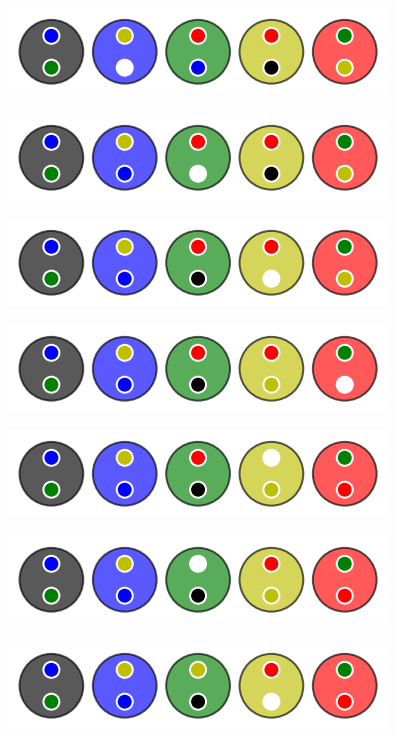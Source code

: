 \begin{multicols}{2}
	\begin{center}   %
		\includegraphics[scale= 0.45]{content/algo_selection/example/000.png}

		\includegraphics[scale= 0.45]{content/algo_selection/example/001.png}

		\includegraphics[scale= 0.45]{content/algo_selection/example/002.png}

		\includegraphics[scale= 0.45]{content/algo_selection/example/003.png}
		
		\includegraphics[scale= 0.45]{content/algo_selection/example/004.png}

		\includegraphics[scale= 0.45]{content/algo_selection/example/005.png}

		\includegraphics[scale= 0.45]{content/algo_selection/example/006.png}


\end{center}
\end{multicols}
